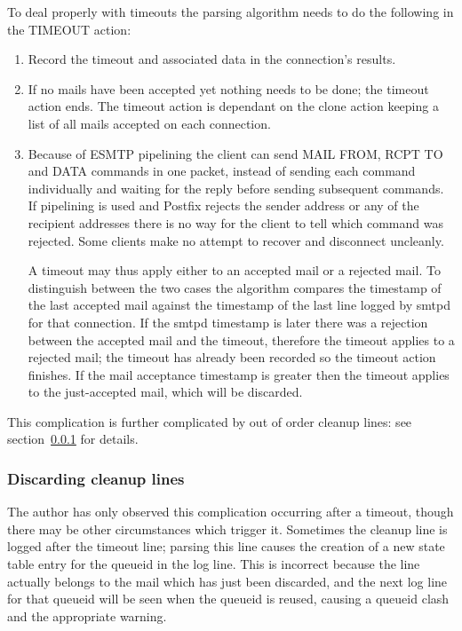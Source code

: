 \documentclass[a4paper,12pt,draft]{article}
\begin{document}
To deal properly with timeouts the parsing algorithm needs to do the
following in the TIMEOUT action:

\begin{enumerate}

    \item Record the timeout and associated data in the connection's
        results.

    \item If no mails have been accepted yet nothing needs to be done; the
        timeout action ends.  The timeout action is dependant on the clone
        action keeping a list of all mails accepted on each connection.

    \item Because of ESMTP pipelining the client can send MAIL FROM, RCPT
        TO and DATA commands in one packet, instead of sending each command
        individually and waiting for the reply before sending subsequent
        commands.  If pipelining is used and Postfix rejects the sender
        address or any of the recipient addresses there is no way for the
        client to tell which command was rejected.  Some clients make no
        attempt to recover and disconnect uncleanly.

        A timeout may thus apply either to an accepted mail or a rejected
        mail.  To distinguish between the two cases the algorithm compares
        the timestamp of the last accepted mail against the timestamp of
        the last line logged by smtpd for that connection.  If the smtpd
        timestamp is later there was a rejection between the accepted mail
        and the timeout, therefore the timeout applies to a rejected mail;
        the timeout has already been recorded so the timeout action
        finishes.  If the mail acceptance timestamp is greater then the
        timeout applies to the just-accepted mail, which will be discarded.

\end{enumerate}

This complication is further complicated by out of order cleanup lines: see
section~\ref{discarding-cleanup-lines} for details.

\subsubsection{Discarding cleanup lines}

\label{discarding-cleanup-lines}

The author has only observed this complication occurring after a timeout,
though there may be other circumstances which trigger it.  Sometimes the
cleanup line is logged after the timeout line; parsing this line causes the
creation of a new state table entry for the queueid in the log line.  This
is incorrect because the line actually belongs to the mail which has just
been discarded, and the next log line for that queueid will be seen when
the queueid is reused, causing a queueid clash and the appropriate warning.
\end{document}
